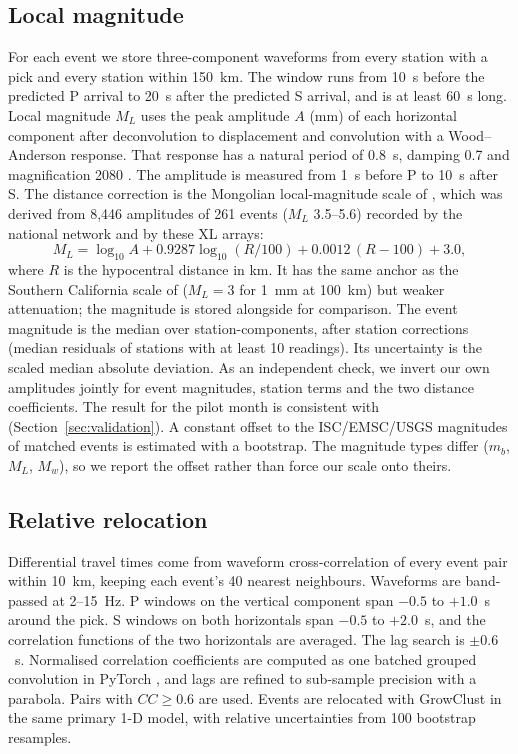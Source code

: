 \documentclass[11pt]{article}
\begin{document}
\subsection{Local magnitude}
For each event we store three-component waveforms from every station with a pick and every station within 150~km. The window runs from 10~s before the predicted P arrival to 20~s after the predicted S arrival, and is at least 60~s long. Local magnitude $M_L$ uses the peak amplitude $A$ (mm) of each horizontal component after deconvolution to displacement and convolution with a Wood--Anderson response. That response has a natural period of 0.8~s, damping 0.7 and magnification 2080 \citep{uhrhammer1990}. The amplitude is measured from 1~s before P to 10~s after S. The distance correction is the Mongolian local-magnitude scale of \citet{ganbat2026ml}, which was derived from 8,446 amplitudes of 261 events ($M_L$ 3.5--5.6) recorded by the national network and by these XL arrays:
\begin{equation}
M_L = \log_{10} A + 0.9287 \log_{10}(R/100) + 0.0012\,(R-100) + 3.0,
\end{equation}
where $R$ is the hypocentral distance in km. It has the same anchor as the Southern California scale of \citet{hutton1987} ($M_L = 3$ for 1~mm at 100~km) but weaker attenuation; the \citet{hutton1987} magnitude is stored alongside for comparison. The event magnitude is the median over station-components, after station corrections (median residuals of stations with at least 10 readings). Its uncertainty is the scaled median absolute deviation. As an independent check, we invert our own amplitudes jointly for event magnitudes, station terms and the two distance coefficients. The result for the pilot month is consistent with \citet{ganbat2026ml} (Section~\ref{sec:validation}). A constant offset to the ISC/EMSC/USGS magnitudes of matched events is estimated with a bootstrap. The magnitude types differ ($m_b$, $M_L$, $M_w$), so we report the offset rather than force our scale onto theirs.

\subsection{Relative relocation}
Differential travel times come from waveform cross-correlation of every event pair within 10~km, keeping each event's 40 nearest neighbours. Waveforms are band-passed at 2--15~Hz. P windows on the vertical component span $-0.5$ to $+1.0$~s around the pick. S windows on both horizontals span $-0.5$ to $+2.0$~s, and the correlation functions of the two horizontals are averaged. The lag search is $\pm0.6$~s. Normalised correlation coefficients are computed as one batched grouped convolution in PyTorch \citep{paszke2019}, and lags are refined to sub-sample precision with a parabola. Pairs with $CC \ge 0.6$ are used. Events are relocated with GrowClust \citep{trugman2017} in the same primary 1-D model, with relative uncertainties from 100 bootstrap resamples.
\end{document}
